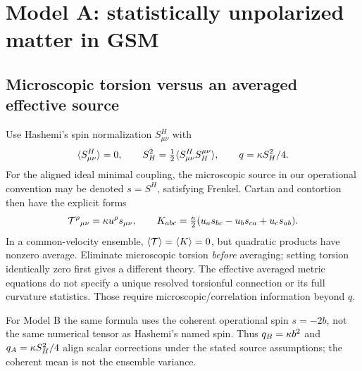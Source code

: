 \section{Model A: statistically unpolarized matter in GSM}
\subsection{Microscopic torsion versus an averaged effective source}
Use Hashemi's spin normalization $S^H_{\mu\nu}$ with
\begin{equation}
 \langle S^H_{\mu\nu}\rangle=0,\qquad
 S_H^2=\tfrac12\langle S^H_{\mu\nu}S_H^{\mu\nu}\rangle,\qquad
 q=\kappa S_H^2/4.
\end{equation}
For the aligned ideal minimal coupling, the microscopic source in our operational convention may be denoted $s=S^H$, satisfying Frenkel. Cartan and contortion then have the explicit forms
\begin{equation}
 \mathcal T^\rho{}_{\mu\nu}=\kappa u^\rho s_{\mu\nu},\qquad
 K_{abc}=\tfrac{\kappa}2(u_a s_{bc}-u_b s_{ca}+u_c s_{ab}).
\end{equation}
In a common-velocity ensemble, $\langle\mathcal T\rangle=\langle K\rangle=0$, but quadratic products have nonzero average. Eliminate microscopic torsion \emph{before} averaging; setting torsion identically zero first gives a different theory. The effective averaged metric equations do not specify a unique resolved torsionful connection or its full curvature statistics. Those require microscopic/correlation information beyond $q$.

For Model B the same formula uses the coherent operational spin $s=-2b$, not the same numerical tensor as Hashemi's named spin. Thus $q_B=\kappa b^2$ and $q_A=\kappa S_H^2/4$ align scalar corrections under the stated source assumptions; the coherent mean is not the ensemble variance.

